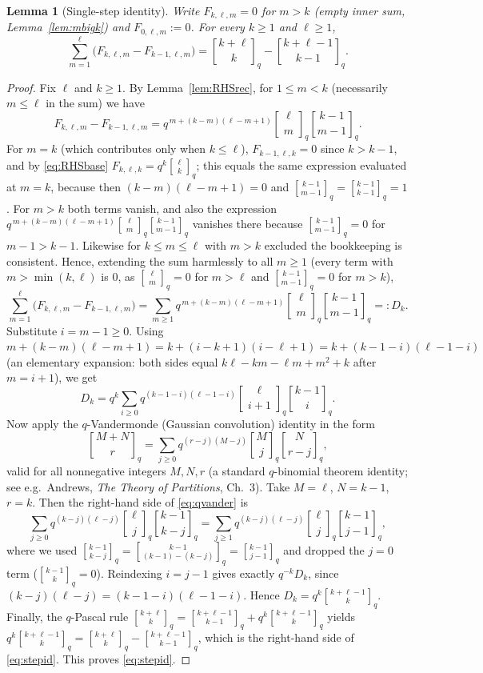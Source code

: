 \documentclass{amsart}
\newtheorem{lemma}{Lemma}
\theoremstyle{definition}
\newcommand{\qbin}[2]{\genfrac{[}{]}{0pt}{}{#1}{#2}_q}
\begin{document}
\begin{lemma}[Single-step identity]\label{lem:step}
Write $F_{k,\ell,m}=0$ for $m>k$ \textup{(}empty inner sum,
Lemma~\ref{lem:mbigk}\textup{)} and $F_{0,\ell,m}:=0$. For every $k\ge1$ and
$\ell\ge1$,
\begin{equation}\label{eq:stepid}
\sum_{m=1}^{\ell}\big(F_{k,\ell,m}-F_{k-1,\ell,m}\big)
=\qbin{k+\ell}{k}-\qbin{k+\ell-1}{k-1}.
\end{equation}
\end{lemma}

\begin{proof}
Fix $\ell$ and $k\ge1$. By Lemma~\ref{lem:RHSrec}, for $1\le m<k$ (necessarily
$m\le\ell$ in the sum) we have
\[
F_{k,\ell,m}-F_{k-1,\ell,m}=q^{\,m+(k-m)(\ell-m+1)}\qbin{\ell}{m}\qbin{k-1}{m-1}.
\]
For $m=k$ (which contributes only when $k\le\ell$), $F_{k-1,\ell,k}=0$ since $k>k-1$,
and by \eqref{eq:RHSbase} $F_{k,\ell,k}=q^{k}\qbin{\ell}{k}$; this equals the same
expression evaluated at $m=k$, because then $(k-m)(\ell-m+1)=0$ and
$\qbin{k-1}{m-1}=\qbin{k-1}{k-1}=1$. For $m>k$ both terms vanish, and also the
expression $q^{\,m+(k-m)(\ell-m+1)}\qbin{\ell}{m}\qbin{k-1}{m-1}$ vanishes there
because $\qbin{k-1}{m-1}=0$ for $m-1>k-1$. Likewise for $k\le m\le\ell$ with
$m>k$ excluded the bookkeeping is consistent. Hence, extending the sum harmlessly
to all $m\ge1$ (every term with $m>\min(k,\ell)$ is $0$, as $\qbin{\ell}{m}=0$ for
$m>\ell$ and $\qbin{k-1}{m-1}=0$ for $m>k$),
\begin{equation}\label{eq:Dunified}
\sum_{m=1}^{\ell}\big(F_{k,\ell,m}-F_{k-1,\ell,m}\big)
=\sum_{m\ge1}q^{\,m+(k-m)(\ell-m+1)}\qbin{\ell}{m}\qbin{k-1}{m-1}=:D_k.
\end{equation}
Substitute $i=m-1\ge0$. Using
$m+(k-m)(\ell-m+1)=k+(i-k+1)(i-\ell+1)=k+(k-1-i)(\ell-1-i)$ (an elementary
expansion: both sides equal $k\ell-k m-\ell m+m^2+k$ after $m=i+1$), we get
\[
D_k=q^{k}\sum_{i\ge0}q^{(k-1-i)(\ell-1-i)}\qbin{\ell}{i+1}\qbin{k-1}{i}.
\]
Now apply the $q$-Vandermonde (Gaussian convolution) identity in the form
\begin{equation}\label{eq:qvander}
\qbin{M+N}{r}=\sum_{j\ge0}q^{(r-j)(M-j)}\qbin{M}{j}\qbin{N}{r-j},
\end{equation}
valid for all nonnegative integers $M,N,r$ (a standard $q$-binomial theorem
identity; see e.g.\ Andrews, \emph{The Theory of Partitions}, Ch.~3). Take
$M=\ell$, $N=k-1$, $r=k$. Then the right-hand side of \eqref{eq:qvander} is
\[
\sum_{j\ge0}q^{(k-j)(\ell-j)}\qbin{\ell}{j}\qbin{k-1}{k-j}
=\sum_{j\ge1}q^{(k-j)(\ell-j)}\qbin{\ell}{j}\qbin{k-1}{j-1},
\]
where we used $\qbin{k-1}{k-j}=\qbin{k-1}{(k-1)-(k-j)}=\qbin{k-1}{j-1}$ and dropped
the $j=0$ term ($\qbin{k-1}{k}=0$). Reindexing $i=j-1$ gives exactly
$q^{-k}D_k$, since $(k-j)(\ell-j)=(k-1-i)(\ell-1-i)$. Hence
$D_k=q^{k}\qbin{k+\ell-1}{k}$. Finally, the $q$-Pascal rule
$\qbin{k+\ell}{k}=\qbin{k+\ell-1}{k-1}+q^{k}\qbin{k+\ell-1}{k}$ yields
$q^{k}\qbin{k+\ell-1}{k}=\qbin{k+\ell}{k}-\qbin{k+\ell-1}{k-1}$, which is the
right-hand side of \eqref{eq:stepid}. This proves \eqref{eq:stepid}.
\end{proof}
\end{document}
